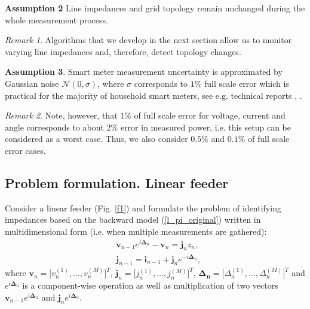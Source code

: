 \documentclass[journal,10pt,onecolumn,draftclsnofoot,]{IEEEtran}
\theoremstyle{plain}
\theoremstyle{definition}
\theoremstyle{remark}
\newtheorem*{remark}{Remark}
\begin{document}
\textbf{Assumption 2} Line impedances and grid topology remain unchanged during the whole measurement process. 
\begin{remark} 
Algorithms that we develop in the next section allow us to monitor varying line impedances and, therefore, detect topology changes.
\end{remark}
\textbf{Assumption 3}. Smart meter measurement uncertainty is approximated by Gaussian noise $\mathcal{N}(0, \sigma)$, where $\sigma$ corresponds to $1\%$ full scale error which is practical for the majority of household smart meters, see e.g. technical reports \cite[Chapter $4$]{NMI_au}, \cite[Chapter $7.1$]{SMmin_au}.
\begin{remark}
  Note, however, that $1\%$ of full scale error for voltage, current and angle corresponds to about $2\%$ error in measured power, i.e. this setup can be considered as a worst case. Thus, we also consider $0.5\%$ and $0.1\%$ of full scale error cases.
\end{remark}

\subsection{Problem formulation. Linear feeder}

Consider a linear feeder (Fig. \ref{f1}) and formulate the problem of identifying impedances based on the backward model (\ref{l_pi_original}) written in multidimensional form (i.e. when multiple measurements are gathered):
\begin{equation}
\begin{split}
&{} \bm{v}_{n-1}e^{i\bm{\Delta}_{n}} - \bm{v}_{n} = \bm{j}_{n}z_{n}, \\
& \bm{j}_{n-1} = \bm{i}_{n-1} + \bm{j}_{n}e^{-i\bm{\Delta}_{n}},
\end{split}
\label{lf-sysid-model}
\end{equation}
where $\bm{v}_{n} = \big[ v^{(1)}_{n}, \ldots, v^{(M)}_{n} \big]^T$, $\bm{j}_{n} = \big[ j^{(1)}_{n}, \ldots, j^{(M)}_{n} \big]^T$, $\bm{\Delta_n} = \big[ \Delta^{(1)}_{n}, \ldots, \Delta^{(M)}_{n} \big]^T$ and $e^{i\bm{\Delta}_{n}}$ is a component-wise operation as well as multiplication of two vectors $\bm{v}_{n-1}e^{i\bm{\Delta}_{n}}$ and $\bm{j}_{n}e^{i\bm{\Delta}_{n}}$.
\end{document}
